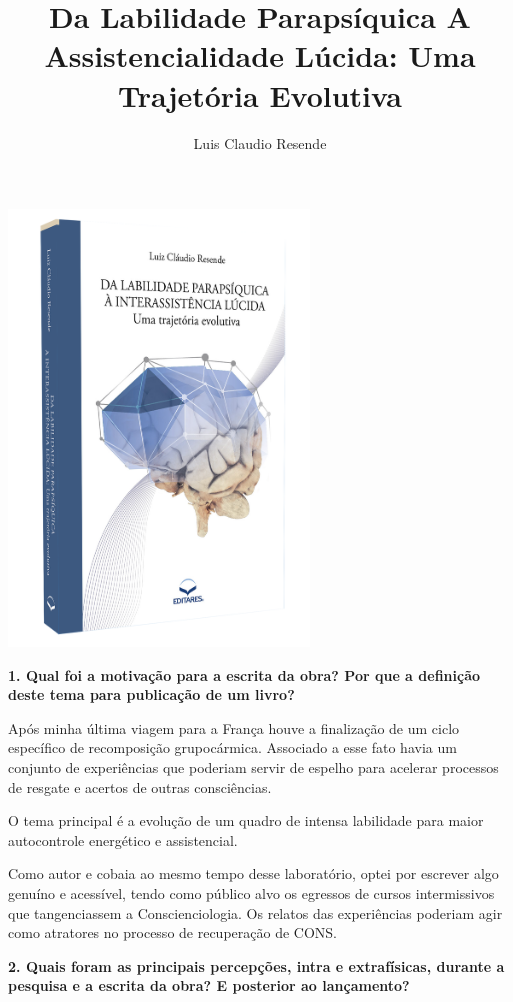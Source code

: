 \documentclass{gescons}
\author{Luis Claudio Resende}
\title{Da Labilidade Parapsíquica A Assistencialidade Lúcida: Uma Trajetória Evolutiva}
\begin{document}
    \makeentrevistatitle

    \begin{multicols}{2}


\begin{center}
    \includegraphics[width=8cm]{articles/entrevista/mockups/Luis_Claudio_Resende-Labilidade.png}
\end{center}

\textbf{1. Qual foi a motivação para a escrita da obra? Por que a definição deste tema para publicação de um livro? }

Após minha última viagem para a França houve a finalização de um ciclo específico de recomposição grupocármica.  Associado a esse fato havia um conjunto de experiências que poderiam servir de espelho para acelerar processos de resgate e acertos de outras consciências.

O tema principal é a evolução de um quadro de intensa labilidade para maior autocontrole energético e assistencial. 

Como autor e cobaia ao mesmo tempo desse laboratório, optei por escrever algo genuíno e acessível, tendo como público alvo os egressos de cursos intermissivos que tangenciassem a Conscienciologia.  Os relatos das experiências poderiam agir como atratores no processo de recuperação de CONS.

\textbf{2.       Quais foram as principais percepções, intra e extrafísicas, durante a pesquisa e a escrita da obra? E posterior ao lançamento?}


\end{multicols}
\end{document}
